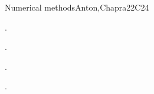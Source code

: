 \begin{syllabus}
\begin{unit}{}{Numerical methods}{Anton,Chapra}{22}{C24}
   \begin{learningoutcomes}
      \item . %
      \item . %
      \item . %
      \item . %
      \end{learningoutcomes}
\end{unit}

\begin{coursebibliography}
\end{coursebibliography}

\end{syllabus}

%
